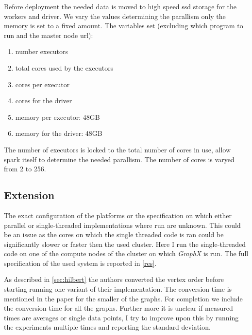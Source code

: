 Before deployment the needed data is moved to high speed ssd storage for the workers and driver. We vary the values determining the parallism only the memory is set to a fixed amount. The variables set (excluding which program to run and the master node url):

\begin{multicols}{2}
\begin{enumerate}
	\item number executors
	\item total cores used by the executors
	\item cores per executor
	\item cores for the driver
	\item memory per executor: 48GB
	\item memory for the driver: 48GB
\end{enumerate}
\end{multicols}

The number of executors is locked to the total number of cores in use, allow spark itself to determine the needed parallism. The number of cores is varyed from 2 to 256.

\subsection{Extension}
The exact configuration of the platforms or the specification on which either parallel or single-threaded implementations where run are unknown. This could be an issue as the cores on which the single threaded code is ran could be significantly slower or faster then the used cluster. Here I run the single-threaded code on one of the compute nodes of the cluster on which \textit{GraphX} is run. The full specification of the used system is reported in \cref{res}.

As described in \cref{sec:hilbert} the authors converted the vertex order before starting running one variant of their implementation. The conversion time is mentioned in the paper for the smaller of the graphs. For completion we include the conversion time for all the graphs. Further more it is unclear if measured times are averages or single data points, I try to improve upon this by running the experiments multiple times and reporting the standard deviation.
